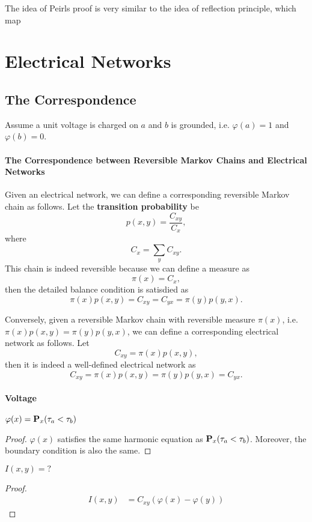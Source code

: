 The idea of Peirls proof is very similar to the idea of reflection principle,
which map 


\section{Electrical Networks}
\subsection{The Correspondence}

Assume a unit voltage is charged on $a$ and $b$ is grounded, i.e. $\varphi(a)=1$ and $\varphi(b)=0$.

\paragraph{The Correspondence between Reversible Markov Chains and Electrical Networks}
Given an electrical network, we can define a corresponding reversible Markov chain as follows.
Let the \textbf{transition probability} be \[p(x,y)=\frac{C_{xy}}{C_x},\] 
where \[C_x=\sum_{y} C_{xy} .\]
This chain is indeed reversible because we can define a measure as 
\[\pi(x)=C_x,\] 
then the detailed balance condition is satisdied as 
\[\pi(x)p(x,y)= C_{xy}= C_{yx}=\pi(y)p(y,x).\]


Conversely, given a reversible Markov chain with reversible measure $\pi(x)$, i.e. $\pi(x)p(x,y)=\pi(y)p(y,x)$,
we can define a corresponding electrical network as follows.
Let \[C_{xy}=\pi(x)p(x,y),\]
then it is indeed a well-defined electrical network as 
\[C_{xy}=\pi(x)p(x,y)=\pi(y)p(y,x)=C_{yx}. \]
\paragraph{Voltage}
\begin{theorem}[Voltage as ]
$\varphi(x)=\mathbf{P}_x(\tau_a<\tau_b)$
\end{theorem}
\begin{proof}
    $\varphi(x)$ satisfies the same harmonic equation as $\mathbf{P}_x(\tau_a<\tau_b)$.
    Moreover, the boundary condition is also the same.
\end{proof}


\begin{theorem}
    $I(x,y)=?$
\end{theorem}
\begin{proof}
    \begin{align*}
        I(x,y)&=C_{xy}(\varphi(x)-\varphi(y))
    \end{align*}
\end{proof}

